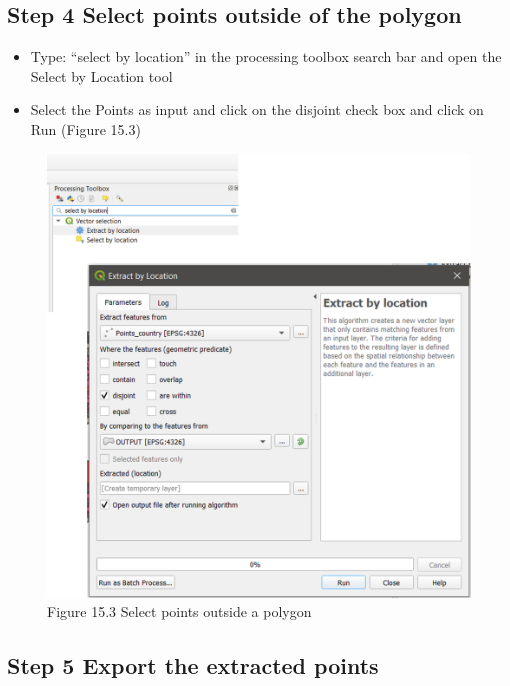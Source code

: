 \documentclass[
  10pt,
  b5paper,
]{book}
\providecommand{\tightlist}{%
  \setlength{\itemsep}{0pt}\setlength{\parskip}{0pt}}
\begin{document}
\hypertarget{step-4-select-points-outside-of-the-polygon}{%
\subsection*{Step 4 Select points outside of the polygon}\label{step-4-select-points-outside-of-the-polygon}}

\begin{itemize}
\tightlist
\item
  Type: ``select by location'' in the processing toolbox search bar and open the Select by Location tool
\item
  Select the Points as input and click on the disjoint check box and click on Run (Figure 15.3)
\end{itemize}

\begin{figure}
\centering
\includegraphics{images/Figure_12.png}
\caption{Figure 15.3 Select points outside a polygon}
\end{figure}

\hypertarget{step-5-export-the-extracted-points}{%
\subsection*{Step 5 Export the extracted points}\label{step-5-export-the-extracted-points}}
\end{document}
